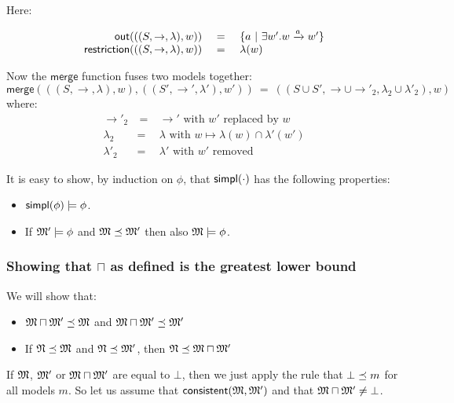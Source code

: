 \NI Here:

\[
\begin{array}{rcl}
  \mathsf{out}(((S,\rightarrow,\lambda),w)) 
     &\ =\ & \{ a \ | \  \exists w' . w \xrightarrow{a} w'\}  \\
  \mathsf{restriction}(((S,\rightarrow,\lambda),w)) 
    & = & 
  \lambda(w) 
\end{array}
\]

\NI Now the $\mathsf{merge}$ function fuses two  models together:
\[
   \mathsf{merge}( ( (S, \rightarrow, \lambda), w),  ( (S', \rightarrow', \lambda'), w')) 
      \ =\ 
   ((S \cup S', \rightarrow \cup \rightarrow'_2, \lambda_2 \cup \lambda'_2), w)
\]
where:
\begin{eqnarray*}
  \rightarrow'_2 &\ =\ & \rightarrow' \mbox{ with } w' \mbox{ replaced by } w  \\
  \lambda_2 & = & \lambda \mbox{ with } w \mapsto \lambda(w) \cap \lambda'(w')  \\
  \lambda'_2 & = & \lambda' \mbox{ with } w' \mbox{ removed } 
\end{eqnarray*}

\NI It is easy to show, by induction on $\phi$, that $\mathsf{simpl}(\cdot)$ has the following properties:

\begin{itemize}

\item $\mathsf{simpl}(\phi) \models \phi$.

\item If $\frak{M}' \models \phi$ and  $\frak{M} \preceq \frak{M}'$ then also  $\frak{M} \models \phi$.
 
\end{itemize}

\subsubsection{Showing that $\sqcap$ as defined is the greatest lower bound}
We will show that:
\begin{itemize}
\item
$\frak{M} \sqcap \frak{M}' \preceq \frak{M}$ and $\frak{M} \sqcap \frak{M}' \preceq \frak{M}'$
\item
If $\frak{N} \preceq \frak{M}$ and $\frak{N} \preceq \frak{M}'$, then $\frak{N} \preceq \frak{M} \sqcap \frak{M}'$
\end{itemize}
If $\frak{M}$, $ \frak{M}'$ or $\frak{M} \sqcap \frak{M}'$ are equal to $\bot$, then we just apply the rule that $\bot \preceq m$ for all models $m$. 
So let us assume that $\mathsf{consistent}(\frak{M}, \frak{M}')$ and that $\frak{M} \sqcap \frak{M}'  \neq \bot$.

